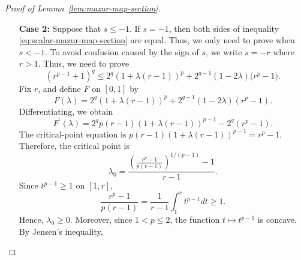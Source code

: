 \documentclass[11pt,a4paper]{amsart}
\theoremstyle{plain}
\theoremstyle{definition}
\begin{document}
\begin{proof}[Proof of Lemma~\ref{lem:mazur-map-section}]
\begin{enumerate}[wide =0pt, labelwidth= 1.1cm]
\[    \]
    Claim that $G' (s) \leq 0$. Equivalently, 
    \[
        2 \left( \frac{(s^p -1)(s^{p-1} -1)}{p(s-1)^2} \right) 
        \leq s^{p-2} (s+1).
    \]
    Using \eqref{eq:Jen-with-s} and the Hermite--Hadamard inequality with the convex function $t \mapsto t^{p-2}$ on $ [1,s]$, we obtain
    \begin{align}
        2 \left( \frac{(s^p -1)(s^{p-1} -1)}{p(s-1)^2} \right) &=2 (p-1)\left( \frac{s^p -1}{p(s-1)} \right) \left( \frac{s^{p-1} -1}{(p-1)(s-1)} \right)
        \\
        &\leq 
        2(p-1) \left(\frac{s+1}{2}\right)^{p-1}\left( \frac{1}{s-1} \int_{1}^s t^{p-2} dt \right)
        \\
        &\leq 
        2(p-1) \left(\frac{s+1}{2}\right)^{p-1} \left( \frac{s^{p-2}+1}{2} \right)
        \\
        &\leq 2^{1-p}s^{p-2}(s+1)^{p-1} (1 + s^{2-p}). \label{eq:final-first-case}
    \end{align}
    Using H\"older's inequality, we obtain
    \[
        1 + s^{2-p} \leq  2^{p-1}(1+s)^{2-p}.
    \]
    Plugging it into \eqref{eq:final-first-case}, we verify that $G'(s) \leq 0$ for $s >1$. Moreover, since $ q \geq 2$ and $p \leq 2$, we get
\[
    \lim_{s\to\infty}G(s)
    =
    \frac{2^{q-1}}{p} \geq 1.
\]
Thus, $G(s)\geq1$ for $s >1$, proving \eqref{eq:to-prove-final-s} and hence
\eqref{eq:scalar-mazur-map-section} in the case $s\geq1$.
\item[\bf Case 2:] Suppose that $s \leq -1$. If $s = -1$, then both sides of inequality \eqref{eq:scalar-mazur-map-section} are equal. Thus, we only need to prove when $s < -1$. To avoid confusion caused by the sign of $s$, we write $s=-r$ where $ r > 1$. Thus, we need to prove
\begin{equation}
\label{eq:scalar-mazur-map-section-2}
    (r^{p-1}+1)^q
    \leq
    2^q(1+ \lambda (r-1))^p
    +
    2^{q-1}(1-2\lambda)
    \bigl(r^p-1\bigr).
\end{equation}
Fix $r$, and define $F$ on $[0,1]$ by
$$
F(\lambda)=2^q(1+\lambda(r-1))^p+2^{q-1}(1-2 \lambda)\left(r^p-1\right) .
$$
Differentiating, we obtain
$$
F^{\prime}(\lambda)=2^q p(r-1)(1+\lambda(r-1))^{p-1}-2^q\left(r^p-1\right) .
$$
The critical-point equation is
$
p(r-1)(1+\lambda(r-1))^{p-1}=r^p-1 .
$
Therefore, the critical point is
$$
\lambda_0=\frac{\left(\frac{r^p-1}{p(r-1)}\right)^{1 /(p-1)}-1}{r-1} .
$$
Since $t^{p-1} \geq 1$ on $[1, r]$,
$$
\frac{r^p-1}{p(r-1)}=\frac{1}{r-1} \int_1^r t^{p-1} d t \geq 1.
$$
Hence,
$
\lambda_0 \geq 0 .
$
Moreover, since $1<p \leq 2$, the function $t \mapsto t^{p-1}$ is concave. By Jensen's inequality,

\end{enumerate}
\end{proof}
\end{document}
